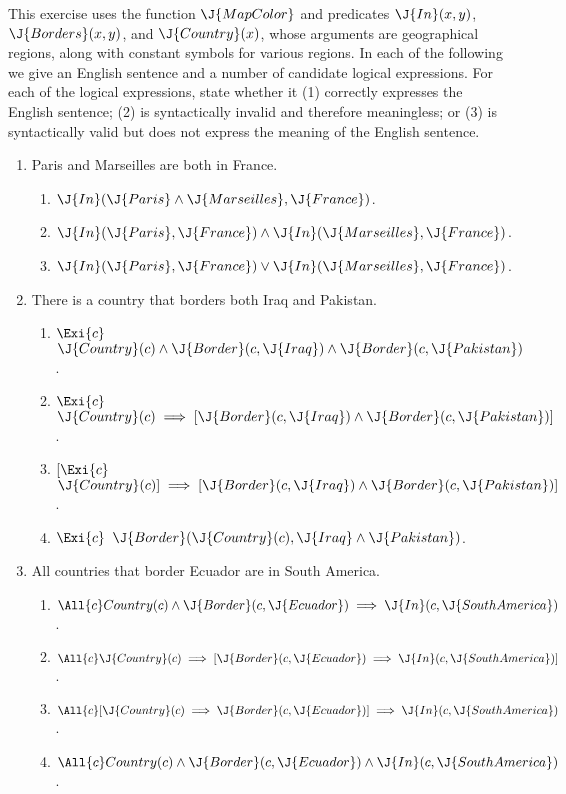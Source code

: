 \begin{uexercise}%
This exercise uses the function \(\J{MapColor}\) and predicates \(\J{In}(x,y)\), \(\J{Borders}(x,y)\),  and \(\J{Country}(x)\), whose arguments are geographical regions,
along with constant symbols for various regions.  In each of the following we give an English 
sentence and a number of candidate logical expressions. For each of
the logical expressions, state whether it
(1) correctly expresses the English sentence; (2) is
syntactically invalid and therefore meaningless; or (3) is syntactically valid
but does not express the meaning of the English sentence. 
\begin{enumerate}
\item Paris and Marseilles are both in France. 
\begin{enumerate}
\item \(\J{In}(\J{Paris} \land \J{Marseilles}, \J{France})\).
\item \(\J{In}(\J{Paris},\J{France}) \land \J{In}(\J{Marseilles},\J{France})\).
\item \(\J{In}(\J{Paris},\J{France}) \lor \J{In}(\J{Marseilles},\J{France})\).
\end{enumerate}

\item There is a country that borders both Iraq and Pakistan.
\begin{enumerate}
\item \(\Exi{c}\) \(\J{Country}(c) \land \J{Border}(c,\J{Iraq}) \land \J{Border}(c,\J{Pakistan})\).
\item \(\Exi{c}\) \(\J{Country}(c) \implies [\J{Border}(c,\J{Iraq}) \land \J{Border}(c,\J{Pakistan})]\).
\item \([\Exi{c}\) \(\J{Country}(c)] \implies [\J{Border}(c,\J{Iraq}) \land \J{Border}(c,\J{Pakistan})]\).
\item \(\Exi{c}\) \(\J{Border}(\J{Country}(c),\J{Iraq} \land \J{Pakistan})\).
\end{enumerate}

\item All countries that border Ecuador are in South America.
\begin{enumerate}
\item \(\All{c}  Country(c) \land \J{Border}(c,\J{Ecuador}) \implies \J{In}(c,\J{SouthAmerica})\).
\item \(\All{c}  \J{Country}(c) \implies [\J{Border}(c,\J{Ecuador}) \implies \J{In}(c,\J{SouthAmerica})]\).
\item \(\All{c}  [\J{Country}(c) \implies \J{Border}(c,\J{Ecuador})] \implies \J{In}(c,\J{SouthAmerica})\).
\item \(\All{c}  Country(c) \land \J{Border}(c,\J{Ecuador}) \land \J{In}(c,\J{SouthAmerica})\).
\end{enumerate}


\end{enumerate}
\end{uexercise}
